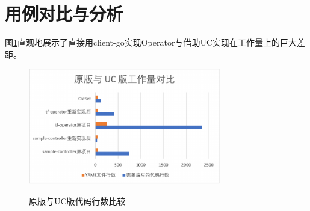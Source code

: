 \documentclass[macfonts,master]{njuthesis}
\begin{document}
%
%
%
%
%

\section{用例对比与分析}


图\ref{fig:operator-cl}直观地展示了直接用client-go实现Operator与借助UC实现在工作量上的巨大差距。

\begin{figure}[htbp]
  \centering
  \includegraphics[width=0.75\textwidth]{pics/operator-line.pdf}\\
  \caption{原版与UC版代码行数比较}\label{fig:operator-cl}
\end{figure}
\end{document}
